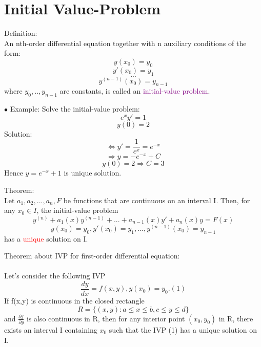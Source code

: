\documentclass[12pt]{article}
\begin{document}
\section{Initial Value-Problem}
\begin{mybox}
    Definition:\\ An nth-order differential equation together with n auxiliary conditions of
the form: 
$$y(x_0) = y_0$$
$$y'(x_0) = y_1$$
$$...$$
$$y^{(n-1)}(x_0) = y_{n-1}$$
where $y_0,..,y_{n-1}$ are constants,  is called an \textcolor{purple}{initial-value problem}.
\end{mybox}
$\bullet$ Example: Solve the initial-value problem: \\
$$e^xy' =1$$
$$y(0) = 2$$
Solution: \\
$$\Leftrightarrow y' = \frac{1}{e^x} = e^{-x}$$
$$\Rightarrow y = -e^{-x} + C$$ 
$$y(0) = 2 \Rightarrow C =3 $$ 
Hence $y = e^{-x} +1$ is unique solution. 
\\
\begin{mybox}
    Theorem:\\
    Let $a_1, a_2, . . . , a_n, F$ be functions that are continuous on an interval I. Then, for any $x_0 \in I$, the initial-value problem
    $$y^{(n)} + a_1(x)y^{(n-1)}+...+a_{n-1}(x)y'+ a_n(x)y= F(x)$$
    $$y(x_0)=y_0,y'(x_0) = y_1,...,y^{(n-1)}(x_0)=y_{n-1}$$
    has a \textcolor{red}{unique} solution on I.
\end{mybox}

\begin{mybox}
    Theorem about IVP for first-order differential equation: \\
    \\
    Let's consider the following IVP \\
    $$\frac{dy}{dx} = f(x,y) , y(x_0) = y_0. (1)$$
    If f(x,y) is continuous  in the closed rectangle \\
    $$R = \{(x,y): a \leq x \leq b,c \leq y\leq d\}$$
    and $\frac{\partial f}{\partial y}$ is also continuous in R, then for any interior point $(x_0, y_0)$ in R,
there exists an interval I containing $x_0$ such that the IVP (1) has a
unique solution on I.
\end{mybox}
\end{document}
